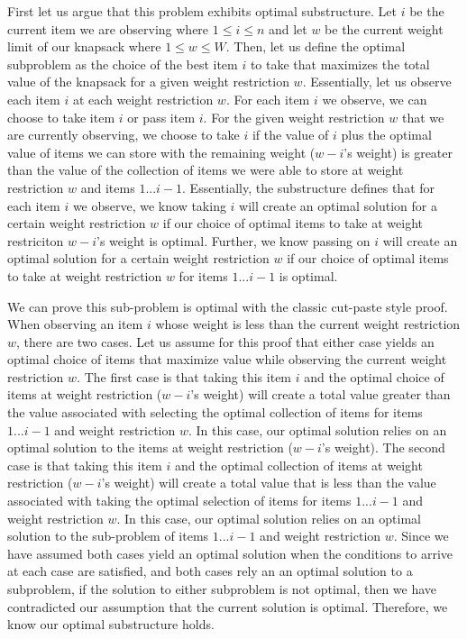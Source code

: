 \documentclass[11pt]{article}
\begin{document}
First let us argue that this problem exhibits optimal substructure. Let $i$ be the current item we are observing where $1 \leq i \leq n$ and let $w$ be the current weight limit of our knapsack where $1 \leq w \leq W$. Then, let us define the optimal subproblem as the choice of the best item $i$ to take that maximizes the total value of the knapsack for a given weight restriction $w$. Essentially, let us observe each item $i$ at each weight restriction $w$. For each item $i$ we observe, we can choose to take item $i$ or pass item $i$. For the given weight restriction $w$ that we are currently observing, we choose to take $i$ if the value of $i$ plus the optimal value of items we can store with the remaining weight ($w - i$'s weight) is greater than the value of the collection of items we were able to store at weight restriction $w$ and items $1...i-1$. Essentially, the substructure defines that for each item $i$ we observe, we know taking $i$ will create an optimal solution for a certain weight restriction $w$ if our choice of optimal items to take at weight restriciton $w - i$'s weight is optimal. Further, we know passing on $i$ will create an optimal solution for a certain weight restriction $w$ if our choice of optimal items to take at weight restriction $w$ for items $1...i-1$ is optimal.

We can prove this sub-problem is optimal with the classic cut-paste style proof. When observing an item $i$ whose weight is less than the current weight restriction $w$, there are two cases. Let us assume for this proof that either case yields an optimal choice of items that maximize value while observing the current weight restriction $w$. The first case is that taking this item $i$ and the optimal choice of items at weight restriction ($w - i$'s weight) will create a total value greater than the value associated with selecting the optimal collection of items for items $1...i-1$ and weight restriction $w$. In this case, our optimal solution relies on an optimal solution to the items at weight restriction ($w - i$'s weight). The second case is that taking this item $i$ and the optimal collection of items at weight restriction ($w - i$'s weight) will create a total value that is less than the value associated with taking the optimal selection of items for items $1...i-1$ and weight restriction $w$. In this case, our optimal solution relies on an optimal solution to the sub-problem of items $1...i-1$ and weight restriction $w$. Since we have assumed both cases yield an optimal solution when the conditions to arrive at each case are satisfied, and both cases rely an an optimal solution to a subproblem, if the solution to either subproblem is not optimal, then we have contradicted our assumption that the current solution is optimal. Therefore, we know our optimal substructure holds.
\end{document}
